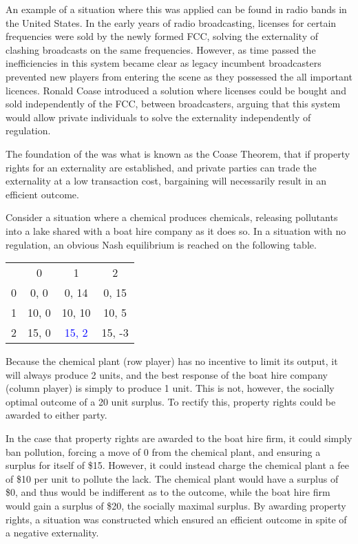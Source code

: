 \documentclass[12pt]{report}
\begin{document}
\begin{flushleft}
\bigskip
An example of a situation where this was applied can be found in radio bands in
the United States. In the early years of radio broadcasting, licenses for 
certain frequencies were sold by the newly formed FCC, solving the externality
of clashing broadcasts on the same frequencies. However, as time passed the
inefficiencies in this system became clear as legacy incumbent broadcasters
prevented new players from entering the scene as they possessed the all 
important licences. Ronald Coase introduced a solution where licenses could
be bought and sold independently of the FCC, between broadcasters, arguing that
this system would allow private individuals to solve the externality 
independently of regulation.

\bigskip
The foundation of the was what is known as the Coase Theorem, that if property
rights for an externality are established, and private parties can trade the
externality at a low transaction cost, bargaining will necessarily result in an
efficient outcome.

\bigskip
Consider a situation where a chemical produces chemicals, releasing pollutants
into a lake shared with a boat hire company as it does so. In a situation with
no regulation, an obvious Nash equilibrium is reached on the following table.
\begin{center}
    \begin{tabular}{c|c|c|c}
        & 0 & 1 & 2 \\
        0 & 0, 0 & 0, 14 & 0, 15 \\
        1 & 10, 0 & 10, 10 & 10, 5 \\
        2 & 15, 0 & \textcolor{blue}{15, 2} & 15, -3 \\
    \end{tabular}        
\end{center}
Because the chemical plant (row player) has no incentive to limit its output, 
it will always produce 2 units, and the best response of the boat hire company
(column player) is simply to produce 1 unit. This is not, however, the socially
optimal outcome of a 20 unit surplus. To rectify this, property rights could be
awarded to either party.

\bigskip
In the case that property rights are awarded to the boat hire firm, it could
simply ban pollution, forcing a move of 0 from the chemical plant, and ensuring
a surplus for itself of \$15. However, it could instead charge the chemical 
plant a fee of \$10 per unit to pollute the lack. The chemical plant would have
a surplus of \$0, and thus would be indifferent as to the outcome, while the
boat hire firm would gain a surplus of \$20, the socially maximal surplus. By
awarding property rights, a situation was constructed which ensured an
efficient outcome in spite of a negative externality.


\end{flushleft}
\end{document}
